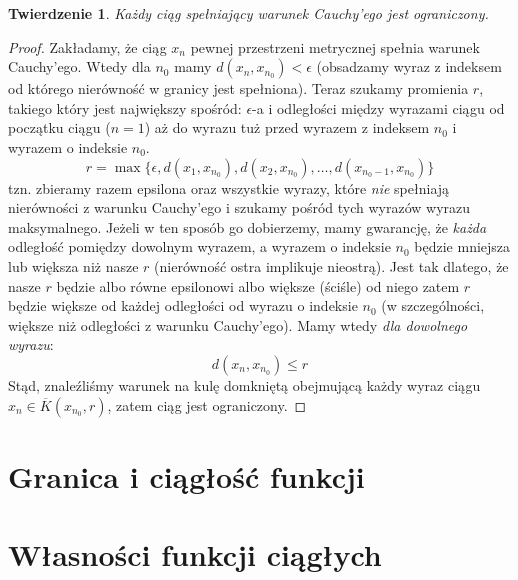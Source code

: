 \documentclass{article}
\newtheorem*{theorem}{Twierdzenie}
\begin{document}
\begin{theorem}
    Każdy ciąg spełniający warunek Cauchy'ego jest ograniczony.
\end{theorem}
\begin{proof}
    Zakładamy, że ciąg \(x_n\) pewnej przestrzeni metrycznej spełnia warunek Cauchy'ego. Wtedy dla
    \(n_0\) mamy \(d(x_n , x_{n_{0}}) < \epsilon\) (obsadzamy wyraz z indeksem od którego nierówność w granicy jest spełniona).
    Teraz szukamy promienia \(r\), takiego który jest największy spośród: \(\epsilon\)-a i odległości między wyrazami ciągu od 
    początku ciągu (\(n = 1\)) aż do wyrazu tuż przed wyrazem z indeksem \(n_0\) i wyrazem o indeksie \(n_0\).
    \begin{equation*}
        r = \max\{\epsilon, d(x_1, x_{n_0}), d(x_2, x_{n_0}), \dots, d(x_{n_{0} - 1}, x_{n_0})\}
    \end{equation*}
    tzn. zbieramy razem epsilona oraz wszystkie wyrazy, które \emph{nie} spełniają nierówności z warunku Cauchy'ego i szukamy
    pośród tych wyrazów wyrazu maksymalnego. Jeżeli w ten sposób go dobierzemy, mamy gwarancję, że \emph{każda} odległość pomiędzy
    dowolnym wyrazem, a wyrazem o indeksie \(n_0\) będzie mniejsza lub większa niż nasze \(r\) (nierówność ostra implikuje nieostrą).
    Jest tak dlatego, że nasze \(r\) będzie albo równe epsilonowi albo większe (ściśle) od niego zatem \(r\) będzie większe od każdej
    odległości od wyrazu o indeksie \(n_0\) (w szczególności, większe niż odległości z warunku Cauchy'ego).
    Mamy wtedy \emph{dla dowolnego wyrazu}:
    \begin{equation*}
        d(x_n, x_{n_{0}}) \leq r
    \end{equation*}
    Stąd, znaleźliśmy warunek na kulę domkniętą obejmującą każdy wyraz ciągu \( x_n \in \overline{K}(x_{n_{0}}, r)\),
    zatem ciąg jest ograniczony.
\end{proof}

\section{Granica i ciągłość funkcji}
\section{Własności funkcji ciągłych}
\end{document}
